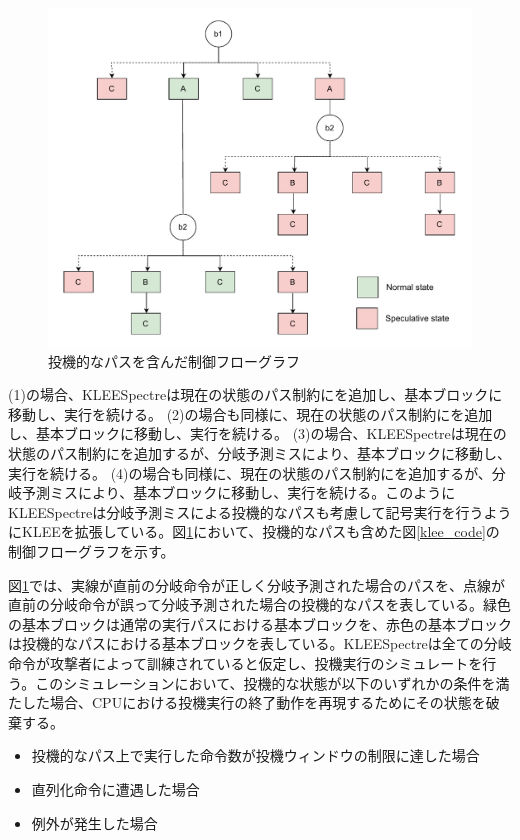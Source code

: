 \begin{figure}[tb]
  \centering
  \includegraphics[width=\linewidth]{img/klee_CFG.drawio.pdf}
  \caption{投機的なパスを含んだ制御フローグラフ}
  \label{fig:klee_cfg}
\end{figure}


(1)の場合、KLEESpectreは現在の状態のパス制約にを追加し、基本ブロックに移動し、実行を続ける。
(2)の場合も同様に、現在の状態のパス制約にを追加し、基本ブロックに移動し、実行を続ける。
(3)の場合、KLEESpectreは現在の状態のパス制約にを追加するが、分岐予測ミスにより、基本ブロックに移動し、実行を続ける。
(4)の場合も同様に、現在の状態のパス制約にを追加するが、分岐予測ミスにより、基本ブロックに移動し、実行を続ける。このようにKLEESpectreは分岐予測ミスによる投機的なパスも考慮して記号実行を行うようにKLEEを拡張している。図\ref{fig:klee_cfg}において、投機的なパスも含めた図\ref{klee_code}の制御フローグラフを示す。\par
図\ref{fig:klee_cfg}では、実線が直前の分岐命令が正しく分岐予測された場合のパスを、点線が直前の分岐命令が誤って分岐予測された場合の投機的なパスを表している。緑色の基本ブロックは通常の実行パスにおける基本ブロックを、赤色の基本ブロックは投機的なパスにおける基本ブロックを表している。KLEESpectreは全ての分岐命令が攻撃者によって訓練されていると仮定し、投機実行のシミュレートを行う。このシミュレーションにおいて、投機的な状態が以下のいずれかの条件を満たした場合、CPUにおける投機実行の終了動作を再現するためにその状態を破棄する。\par
\begin{itemize}
  \item 投機的なパス上で実行した命令数が投機ウィンドウの制限に達した場合
  \item 直列化命令に遭遇した場合
  \item 例外が発生した場合
\end{itemize}


